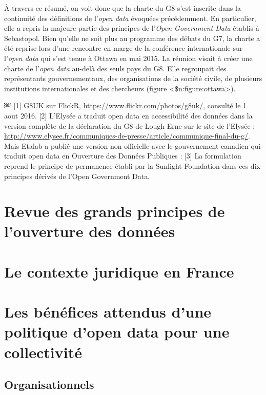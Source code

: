 \documentclass[]{book}
\theoremstyle{definition}
\theoremstyle{definition}
\theoremstyle{definition}
\theoremstyle{remark}
\begin{document}
À travers ce résumé, on voit donc que la charte du G8 s'est inscrite
dans la continuité des définitions de l'\emph{open data} évoquées
précédemment. En particulier, elle a repris la majeure partie des
principes de l'\emph{Open Government Data} établis à Sebastopol. Bien
qu'elle ne soit plus au programme des débats du G7, la charte a été
reprise lors d'une rencontre en marge de la conférence internationale
sur l'\emph{open data} qui s'est tenue à Ottawa en mai 2015. La réunion
visait à créer une charte de l'\emph{open data} au-delà des seuls pays
du G8. Elle regroupait des représentants gouvernementaux, des
organisations de la société civile, de plusieurs institutions
internationales et des chercheurs (figure
\textless{}\$n:figure:ottawa\textgreater{}).

￼ {[}1{]} G8UK sur FlickR, \url{https://www.flickr.com/photos/g8uk/},
consulté le 1 aout 2016. {[}2{]} L'Elysée a traduit open data en
accessibilité des données dans la version complète de la déclaration du
G8 de Lough Erne sur le site de l'Elysée :
\url{http://www.elysee.fr/communiques-de-presse/article/communique-final-du-g/}.
Mais Etalab a publié une version non officielle avec le gouvernement
canadien qui traduit open data en Ouverture des Données Publiques :
{[}3{]} La formulation reprend le principe de permanence établi par la
Sunlight Foundation dans ces dix principes dérivés de l'Open Government
Data.

\section{Revue des grands principes de l'ouverture des
données}\label{revue-des-grands-principes-de-louverture-des-donnees}

\section{Le contexte juridique en
France}\label{le-contexte-juridique-en-france}

\section{Les bénéfices attendus d'une politique d'open data pour une
collectivité}\label{les-benefices-attendus-dune-politique-dopen-data-pour-une-collectivite}

\subsection{Organisationnels}\label{organisationnels}
\end{document}
